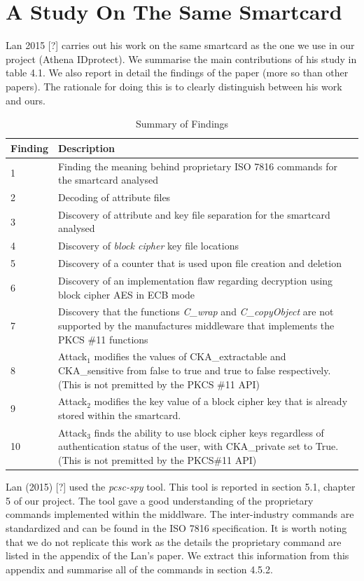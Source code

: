 \documentclass[bsc,frontabs,twoside,singlespacing,parskip,deptreport]{infthesis}     %
\begin{document}
\section{A Study On The Same Smartcard}

Lan 2015 [?] carries out his work on the same smartcard as the one we use in our project (Athena IDprotect). We summarise the main contributions of his study in table 4.1. We also report in detail the findings of the paper (more so than other papers). The rationale for doing this is to clearly distinguish between his work and ours.

\begin{table}[H]
\begin{tabular}{|l|p{10cm}|}
\hline
Finding & Description\\
\hline
1 & Finding the meaning behind proprietary ISO 7816 commands for the smartcard analysed\\
\hline
2 & Decoding of attribute files\\
\hline
3 & Discovery of attribute and key file separation for the smartcard analysed\\
\hline
4 &Discovery of \textit{block cipher} key file locations\\
\hline
5 & Discovery of a counter that is used upon file creation and deletion\\
\hline
6 & Discovery of an implementation flaw regarding decryption using block cipher AES in ECB mode\\
\hline
7 & Discovery that the functions \textit{C\_wrap} and \textit{C\_copyObject} are not supported by the manufactures middleware that implements the PKCS \#11 functions\\
\hline
8 & Attack$_1$ modifies the values of CKA\_extractable and CKA\_sensitive from false to true and true to false respectively. (This is not premitted by the PKCS \#11 API)\\
\hline
9 & Attack$_2$ modifies the key value of a block cipher key that is already stored within the smartcard.\\
\hline
10 & Attack$_3$ finds the ability to use block cipher keys regardless of authentication status of the user, with CKA\_private set to True. (This is not premitted by the PKCS\#11 API)\\
\hline
\end{tabular}
\caption{Summary of Findings}
\end{table}

Lan (2015) [?] used the \textit{pcsc-spy} tool. This tool is reported in section 5.1, chapter 5 of our project. The tool gave a good understanding of the proprietary commands implemented within the middlware. The inter-industry commands are standardized and can be found in the ISO 7816 specification. It is worth noting that we do not replicate this work as the details the proprietary command are listed in the appendix of the Lan's paper. We extract this information from this appendix and summarise all of the commands in section 4.5.2.
\end{document}
